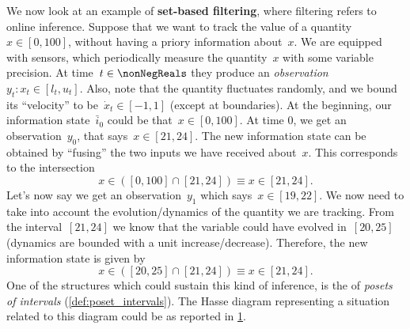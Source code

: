 \begin{example}
	We now look at an example of \textbf{set-based filtering}, where filtering refers to online inference.
	Suppose that we want to track the value of a quantity~$x\in [0,100]$, without having a priory information about~$x$.
	We are equipped with sensors, which periodically measure the quantity~$x$ with some variable precision.
	At time~$t\in \nonNegReals $ they produce an \emph{observation}~$y_t\colon x_t\in [l_t,u_t]$.
	Also, note that the quantity fluctuates randomly, and we bound its ``velocity'' to be~$\dot{x}_t\in [-1,1]$ (except at boundaries).
	At the beginning, our information state~$\bar{i}_0$ could be that~$x\in [0,100]$.
	At time 0, we get an observation~$y_0$, that says~$x\in [21,24]$.
	The new information state can be obtained by ``fusing'' the two inputs we have received about~$x$.
	This corresponds to the intersection
	\begin{equation*}
		x\in \left( [0,100] \cap [21,24]\right)\equiv x\in [21,24].
	\end{equation*}
	Let's now say we get an observation~$y_1$ which says~$x\in [19,22]$.
	We now need to take into account the evolution/dynamics of the quantity we are tracking.
	From the interval~$[21,24]$ we know that the variable could have evolved in~$[20,25]$ (dynamics are bounded with a unit increase/decrease).
	Therefore, the new information state is given by
	\begin{equation*}
		x\in \left( [20,25] \cap [21,24]\right)\equiv x\in [21,24].
	\end{equation*}
	One of the structures which could sustain this kind of inference, is the of \emph{posets of intervals} (\cref{def:poset_intervals}).
	The Hasse diagram representing a situation related to this diagram could be as reported in \cref{fig:hasse_filtering}.
	\begin{figure}[h!]
		\centering
		\caption{}
		\label{fig:hasse_filtering}
	\end{figure}
\end{example}

